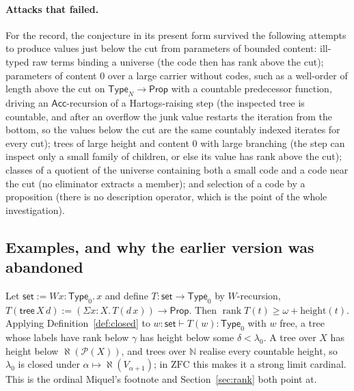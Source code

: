 \documentclass[10pt]{article}
\newcommand{\N}{\mathbb{N}}
\newcommand{\Prop}{\mathsf{Prop}}
\newcommand{\Type}{\mathsf{Type}}
\newcommand{\ZFC}{\mathrm{ZFC}}
\newcommand{\rk}{\operatorname{rank}}
\newcommand{\PP}{\mathcal{P}}
\newcommand{\hartogs}{\aleph}
\begin{document}
\paragraph{Attacks that failed.}
For the record, the conjecture in its present form survived the
following attempts to produce values just below the cut from parameters
of bounded content: ill-typed raw terms binding a universe (the code
then has rank above the cut); parameters of content $0$ over a large
carrier without codes, such as a well-order of length above the cut on
$\Type_N\to\Prop$ with a countable predecessor function, driving an
$\mathsf{Acc}$-recursion of a Hartogs-raising step (the inspected tree is
countable, and after an overflow the junk value restarts the iteration
from the bottom, so the values below the cut are the same countably
indexed iterates for every cut); trees of large height and content $0$
with large branching (the step can inspect only a small family of
children, or else its value has rank above the cut); classes of a
quotient of the universe containing both a small code and a code near
the cut (no eliminator extracts a member); and selection of a code by a
proposition (there is no description operator, which is the point of
the whole investigation).

\subsection{Examples, and why the earlier version was abandoned}\label{sec:examples}

\begin{example}\label{ex:set}
Let $\mathsf{set}:=Wx{:}\Type_0.\,x$ and define $T:\mathsf{set}\to\Type_0$ by
$W$-recursion, $T(\mathsf{tree}\,X\,d):=(\Sigma x{:}X.\,T(d\,x))\to\Prop$.
Then $\rk T(t)\ge\omega+\mathrm{height}(t)$. Applying
Definition~\ref{def:closed} to $w{:}\mathsf{set}\vdash T(w):\Type_0$ with
$w$ free, a tree whose labels have rank below $\gamma$ has height below
some $\delta<\lambda_0$. A tree over $X$ has height below
$\hartogs(\PP(X))$, and trees over $\N$ realise every countable height,
so $\lambda_0$ is closed under $\alpha\mapsto\hartogs(V_{\alpha+1})$; in
$\ZFC$ this makes it a strong limit cardinal. This is the ordinal
Miquel's footnote and Section~\ref{sec:rank} both point at.
\end{example}
\end{document}
